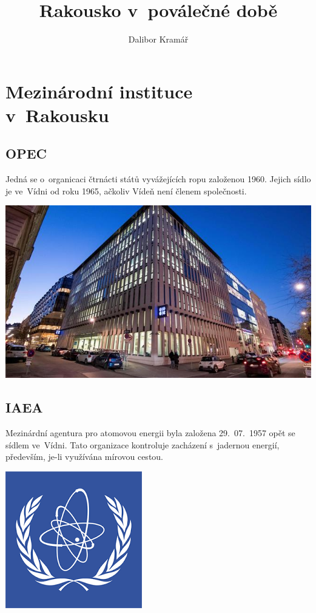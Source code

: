 \documentclass[a2 paper]{article}
\title{Rakousko v~poválečné době}
\author{Dalibor Kramář}
\makeatletter
\let\thetitle\@title
\makeatother
\begin{document}
\pagestyle{empty}
\begin{landscape}
\begin{center}
	{\fontsize{1cm}{1cm} \selectfont \textbf{\thetitle}}
\end{center}
\begin{minipage}[c]{\linewidth}
\centering
\begin{minipage}[t]{0.2\linewidth}
	\section*{Mezinárodní instituce\\ v~Rakousku}
	\subsection*{OPEC}
	Jedná se o~organicaci čtrnácti států vyvážejících ropu založenou 1960. Jejich sídlo je ve~Vídni od roku 1965, ačkoliv Vídeň není členem společnosti.
	\begin{minipage}[t]{\linewidth}
		\includegraphics[width=\linewidth]{images/opec.jpg}
	\end{minipage}
	\subsection*{IAEA}
	Mezinárdní agentura pro atomovou energii byla založena 29.~07.~1957 opět se sídlem ve~Vídni. Tato organizace kontroluje zacházení s~jadernou energií, především, je-li využívána mírovou cestou.
	\begin{minipage}[t]{\linewidth}
		\centering
		\includegraphics[width=0.5\linewidth]{images/iaea.png}
	\end{minipage}

\end{minipage}
\end{minipage}
\end{landscape}
\end{document}
